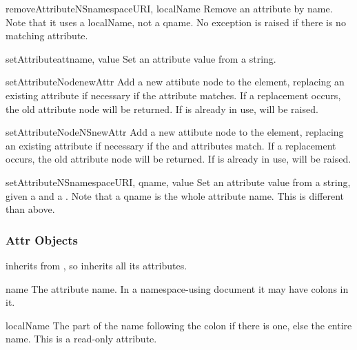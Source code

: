 \begin{methoddesc}[Element]{removeAttributeNS}{namespaceURI, localName}
Remove an attribute by name.  Note that it uses a localName, not a
qname.  No exception is raised if there is no matching attribute.
\end{methoddesc}

\begin{methoddesc}[Element]{setAttribute}{attname, value}
Set an attribute value from a string.
\end{methoddesc}

\begin{methoddesc}[Element]{setAttributeNode}{newAttr}
Add a new attibute node to the element, replacing an existing
attribute if necessary if the  attribute matches.  If a
replacement occurs, the old attribute node will be returned.  If
 is already in use,  will be
raised.
\end{methoddesc}

\begin{methoddesc}[Element]{setAttributeNodeNS}{newAttr}
Add a new attibute node to the element, replacing an existing
attribute if necessary if the  and
 attributes match.  If a replacement occurs, the old
attribute node will be returned.  If  is already in use,
 will be raised.
\end{methoddesc}

\begin{methoddesc}[Element]{setAttributeNS}{namespaceURI, qname, value}
Set an attribute value from a string, given a  and a
.  Note that a qname is the whole attribute name.  This is
different than above.
\end{methoddesc}


\subsubsection{Attr Objects \label{dom-attr-objects}}

 inherits from , so inherits all its
attributes.

\begin{memberdesc}[Attr]{name}
The attribute name.  In a namespace-using document it may have colons
in it.
\end{memberdesc}

\begin{memberdesc}[Attr]{localName}
The part of the name following the colon if there is one, else the
entire name.  This is a read-only attribute.
\end{memberdesc}

